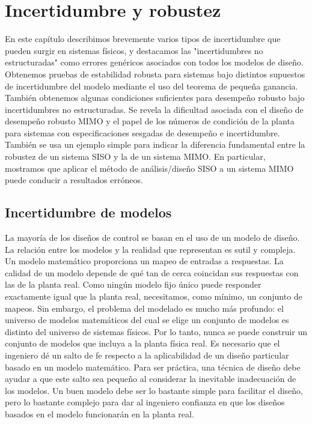 ﻿\chapter{Incertidumbre y robustez}

En este capítulo describimos brevemente varios tipos de incertidumbre que pueden surgir en sistemas físicos, y destacamos las "incertidumbres no estructuradas" como errores genéricos asociados con todos los modelos de diseño. Obtenemos pruebas de estabilidad robusta para sistemas bajo distintos supuestos de incertidumbre del modelo mediante el uso del teorema de pequeña ganancia. También obtenemos algunas condiciones suficientes para desempeño robusto bajo incertidumbres no estructuradas. Se revela la dificultad asociada con el diseño de desempeño robusto MIMO y el papel de los números de condición de la planta para sistemas con especificaciones sesgadas de desempeño e incertidumbre. También se usa un ejemplo simple para indicar la diferencia fundamental entre la robustez de un sistema SISO y la de un sistema MIMO. En particular, mostramos que aplicar el método de análisis/diseño SISO a un sistema MIMO puede conducir a resultados erróneos.

\section{Incertidumbre de modelos}
La mayoría de los diseños de control se basan en el uso de un modelo de diseño. La relación entre los modelos y la realidad que representan es sutil y compleja. Un modelo matemático proporciona un mapeo de entradas a respuestas. La calidad de un modelo depende de qué tan de cerca coincidan sus respuestas con las de la planta real. Como ningún modelo fijo único puede responder exactamente igual que la planta real, necesitamos, como mínimo, un conjunto de mapeos. Sin embargo, el problema del modelado es mucho más profundo: el universo de modelos matemáticos del cual se elige un conjunto de modelos es distinto del universo de sistemas físicos. Por lo tanto, nunca se puede construir un conjunto de modelos que incluya a la planta física real. Es necesario que el ingeniero dé un salto de fe respecto a la aplicabilidad de un diseño particular basado en un modelo matemático. Para ser práctica, una técnica de diseño debe ayudar a que este salto sea pequeño al considerar la inevitable inadecuación de los modelos. Un buen modelo debe ser lo bastante simple para facilitar el diseño, pero lo bastante complejo para dar al ingeniero confianza en que los diseños basados en el modelo funcionarán en la planta real.

